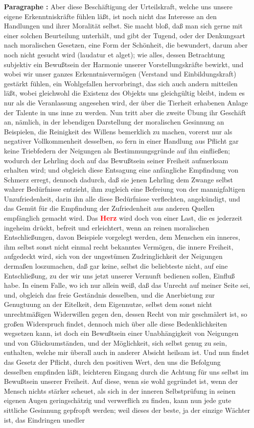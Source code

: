 \documentclass[a4paper,12pt,twoside]{book}
\newcommand{\match}[1]{\textcolor{red}{\textbf{#1}}}
\begin{document}
	\noindent\textbf{Paragraphe : }Aber diese Beschäftigung der Urteilskraft, welche uns unsere eigene Erkenntniskräfte fühlen läßt, ist noch nicht das Interesse an den Handlungen und ihrer Moralität selbst. Sie macht bloß, daß man sich gerne mit einer solchen Beurteilung unterhält, und gibt der Tugend, oder der Denkungsart nach moralischen Gesetzen, eine Form der Schönheit, die bewundert, darum aber noch nicht gesucht wird (laudatur et alget); wie alles, dessen Betrachtung subjektiv ein Bewußtsein der Harmonie unserer Vorstellungskräfte bewirkt, und wobei wir unser ganzes Erkenntnisvermögen (Verstand und Einbildungskraft) gestärkt fühlen, ein Wohlgefallen hervorbringt, das sich auch andern mitteilen läßt, wobei gleichwohl die Existenz des Objekts uns gleichgültig bleibt, indem es nur als die Veranlassung angesehen wird, der über die Tierheit erhabenen Anlage der Talente in uns inne zu werden. Nun tritt aber die zweite Übung ihr Geschäft an, nämlich, in der lebendigen Darstellung der moralischen Gesinnung an Beispielen, die Reinigkeit des Willens bemerklich zu machen, vorerst nur als negativer Vollkommenheit desselben, so fern in einer Handlung aus Pflicht gar keine Triebfedern der Neigungen als Bestimmungsgründe auf ihn einfließen; wodurch der Lehrling doch auf das Bewußtsein seiner Freiheit aufmerksam erhalten wird; und obgleich diese Entsagung eine anfängliche Empfindung von Schmerz erregt, dennoch dadurch, daß sie jenen Lehrling dem Zwange selbst wahrer Bedürfnisse entzieht, ihm zugleich eine Befreiung von der mannigfaltigen Unzufriedenheit, darin ihn alle diese Bedürfnisse verflechten, angekündigt, und das Gemüt für die Empfindung der Zufriedenheit aus anderen Quellen empfänglich gemacht wird. Das \match{Herz} wird doch von einer Last, die es jederzeit ingeheim drückt, befreit  und erleichtert, wenn an reinen moralischen Entschließungen, davon Beispiele vorgelegt werden, dem Menschen ein inneres, ihm selbst sonst nicht einmal recht bekanntes Vermögen, die innere Freiheit, aufgedeckt wird, sich von der ungestümen Zudringlichkeit der Neigungen dermaßen loszumachen, daß gar keine, selbst die beliebteste nicht, auf eine Entschließung, zu der wir uns jetzt unserer Vernunft bedienen sollen, Einfluß habe. In einem Falle, wo ich nur allein weiß, daß das Unrecht auf meiner Seite sei, und, obgleich das freie Geständnis desselben, und die Anerbietung zur Genugtuung an der Eitelkeit, dem Eigennutze, selbst dem sonst nicht unrechtmäßigen Widerwillen gegen den, dessen Recht von mir geschmälert ist, so großen Widerspruch findet, dennoch mich über alle diese Bedenklichkeiten wegsetzen kann, ist doch ein Bewußtsein einer Unabhängigkeit von Neigungen und von Glücksumständen, und der Möglichkeit, sich selbst genug zu sein, enthalten, welche mir überall auch in anderer Absicht heilsam ist. Und nun findet das Gesetz der Pflicht, durch den positiven Wert, den uns die Befolgung desselben empfinden läßt, leichteren Eingang durch die Achtung für uns selbst im Bewußtsein unserer Freiheit. Auf diese, wenn sie wohl gegründet ist, wenn der Mensch nichts stärker scheuet, als sich in der inneren Selbstprüfung in seinen eigenen Augen geringschätzig und verwerflich zu finden, kann nun jede gute sittliche Gesinnung gepfropft werden; weil dieses der beste, ja der einzige Wächter ist, das Eindringen unedler 
\end{document}

